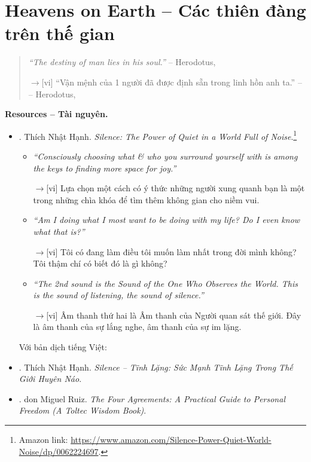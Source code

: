 \documentclass[12pt,oneside]{book}
\begin{document}
\section{Heavens on Earth -- Các thiên đàng trên thế gian}
\begin{quote}
	{\it``The destiny of man lies in his soul.''} -- {\sc Herodotus}, \cite[p. 1]{Adler_human_nature}
	
	{\sf[en]$\to$[vi]} ``Vận mệnh của 1 người đã được định sẵn trong linh hồn anh ta.'' -- -- {\sc Herodotus}, \cite[p. 4]{Adler_human_nature_VN}
\end{quote}
{\bf \textsf{Resources -- Tài nguyên.}}
\begin{itemize}
	\item \cite{Hanh_silence}. {\sc Thích Nhật Hạnh}. {\it Silence: The Power of Quiet in a World Full of Noise}.\footnote{Amazon link: \url{https://www.amazon.com/Silence-Power-Quiet-World-Noise/dp/0062224697}.}	
	\begin{itemize}
		\item {\it``Consciously choosing what \& who you surround yourself with is among the keys to finding more space for joy.''}
		
		{\sf[en]$\to$[vi]} Lựa chọn một cách có ý thức những người xung quanh bạn là một trong những chìa khóa để tìm thêm không gian cho niềm vui.
		
		\item {\it``Am I doing what I most want to be doing with my life? Do I even know what that is?''}
		
		{\sf[en]$\to$[vi]} Tôi có đang làm điều tôi muốn làm nhất trong đời mình không? Tôi thậm chí có biết đó là gì không?
		
		\item {\it``The 2nd sound is the Sound of the One Who Observes the World. This is the sound of listening, the sound of silence.''}
		
		{\sf[en]$\to$[vi]} Âm thanh thứ hai là Âm thanh của Người quan sát thế giới. Đây là âm thanh của sự lắng nghe, âm thanh của sự im lặng.
	\end{itemize}
	Với bản dịch tiếng Việt:
	\item \cite{Hanh_silence_VN}. {\sc Thích Nhật Hạnh}. {\it Silence -- Tĩnh Lặng: Sức Mạnh Tĩnh Lặng Trong Thế Giới Huyên Náo}.
	\item \cite{Ruiz_4_agreements}. {\sc don Miguel Ruiz}. {\it The Four Agreements: A Practical Guide to Personal Freedom (A Toltec Wisdom Book)}.
	

\end{itemize}
\end{document}
